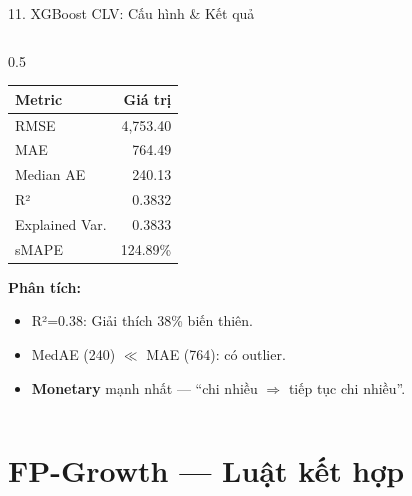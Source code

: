 \documentclass[10pt, aspectratio=169]{beamer}
\begin{document}
\begin{frame}{11. XGBoost CLV: Cấu hình \& Kết quả}
\begin{columns}[T]
\begin{column}{0.5\textwidth}
            \begin{tabularx}{\linewidth}{Xr}
                \toprule
                \textbf{Metric} & \textbf{Giá trị} \\
                \midrule
                RMSE & 4,753.40 \\
                MAE & 764.49 \\
                Median AE & 240.13 \\
                R² & 0.3832 \\
                Explained Var. & 0.3833 \\
                sMAPE & 124.89\% \\
                \bottomrule
            \end{tabularx}
            
            \vspace{0.15cm}
            \textbf{Phân tích:}
            \begin{itemize}
                \item R²=0.38: Giải thích 38\% biến thiên.
                \item MedAE (240) $\ll$ MAE (764): có outlier.
                \item \textbf{Monetary} mạnh nhất --- ``chi nhiều $\Rightarrow$ tiếp tục chi nhiều''.
            \end{itemize}
        \end{column}
    \end{columns}
\end{frame}

\section{FP-Growth --- Luật kết hợp}
\end{document}
